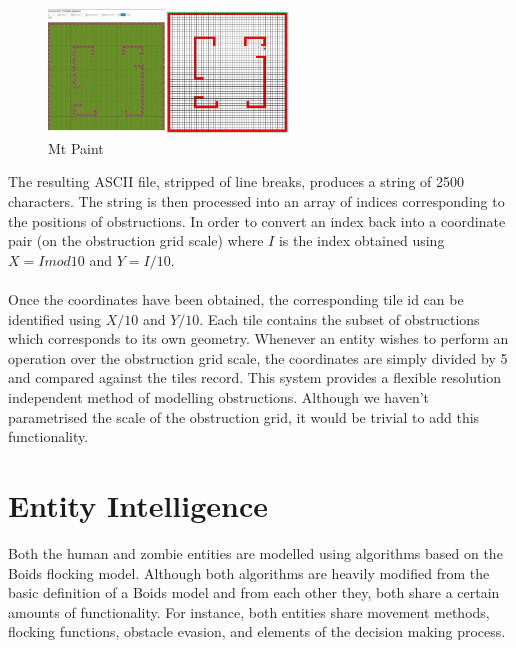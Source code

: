 \documentclass[10pt, a4paper, conference, compsocconf]{IEEEtran}
\begin{document}
\begin{figure}[h]
  \centering
  \includegraphics[width=2.5in]{../img/mt_paint.png}
\caption{Mt Paint}
    \label{fig:mtpaint}
\end{figure}

The resulting ASCII file, stripped of line breaks, produces a string of 2500 characters. The string is then processed into an array of indices corresponding to the positions of obstructions. In order to convert an index back into a coordinate pair (on the obstruction grid scale) where \(I\) is the index obtained using \(X = I mod 10\) and \(Y = I / 10\).\\
\\
Once the coordinates have been obtained, the corresponding tile id can be identified using \(X / 10\) and \(Y / 10\). Each tile contains the subset of obstructions which corresponds to its own geometry. Whenever an entity wishes to perform an operation over the obstruction grid scale, the coordinates are simply divided by 5 and compared against the tiles record. This system provides a flexible resolution independent method of modelling obstructions. Although we haven't parametrised the scale of the obstruction grid, it would be trivial to add this functionality.

\section{Entity Intelligence \label{behaviours}}
Both the human and zombie entities are modelled using algorithms based on the Boids flocking model. Although both algorithms are heavily modified from the basic definition of a Boids model and from each other they, both share a certain amounts of functionality. For instance, both entities share movement methods, flocking functions, obstacle evasion, and elements of the decision making process.\\
\end{document}
